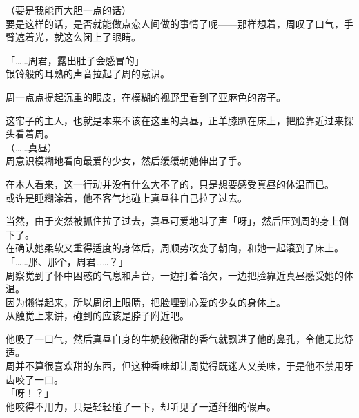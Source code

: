 （要是我能再大胆一点的话）\\

要是这样的话，是否就能做点恋人间做的事情了呢——那样想着，周叹了口气，手臂遮着光，就这么闭上了眼睛。\\

\vspace{2\baselineskip}

「……周君，露出肚子会感冒的」\\

银铃般的耳熟的声音拉起了周的意识。

周一点点提起沉重的眼皮，在模糊的视野里看到了亚麻色的帘子。

这帘子的主人，也就是本来不该在这里的真昼，正单膝趴在床上，把脸靠近过来探头看着周。\\

（……真昼）\\

周意识模糊地看向最爱的少女，然后缓缓朝她伸出了手。

在本人看来，这一行动并没有什么大不了的，只是想要感受真昼的体温而已。\\

或许是睡糊涂着，他不客气地碰上真昼往自己拉了过去。

当然，由于突然被抓住拉了过去，真昼可爱地叫了声「呀」，然后压到周的身上倒下了。\\

在确认她柔软又重得适度的身体后，周顺势改变了朝向，和她一起滚到了床上。\\

「……那、那个，周君……？」\\

周察觉到了怀中困惑的气息和声音，一边打着哈欠，一边把脸靠近真昼感受她的体温。\\

因为懒得起来，所以周闭上眼睛，把脸埋到心爱的少女的身体上。\\

从触觉上来讲，碰到的应该是脖子附近吧。

他吸了一口气，然后真昼自身的牛奶般微甜的香气就飘进了他的鼻孔，令他无比舒适。\\

周并不算很喜欢甜的东西，但这种香味却让周觉得既迷人又美味，于是他不禁用牙齿咬了一口。\\

「呀！？」\\

他咬得不用力，只是轻轻碰了一下，却听见了一道纤细的假声。

